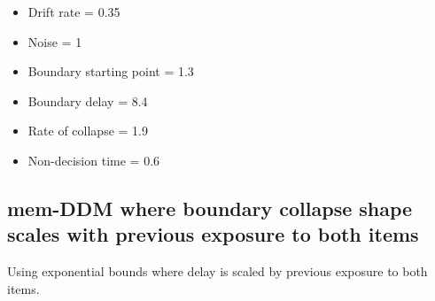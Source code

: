 \documentclass[
]{book}
\providecommand{\tightlist}{%
  \setlength{\itemsep}{0pt}\setlength{\parskip}{0pt}}
\begin{document}
\begin{itemize}
\tightlist
\item
  Drift rate = 0.35
\item
  Noise = 1
\item
  Boundary starting point = 1.3
\item
  Boundary delay = 8.4
\item
  Rate of collapse = 1.9
\item
  Non-decision time = 0.6
\end{itemize}

\hypertarget{mem-ddm-where-boundary-collapse-shape-scales-with-previous-exposure-to-both-items}{%
\subsection{mem-DDM where boundary collapse shape scales with previous exposure to both items}\label{mem-ddm-where-boundary-collapse-shape-scales-with-previous-exposure-to-both-items}}

Using exponential bounds where delay is scaled by previous exposure to both items.
\end{document}
